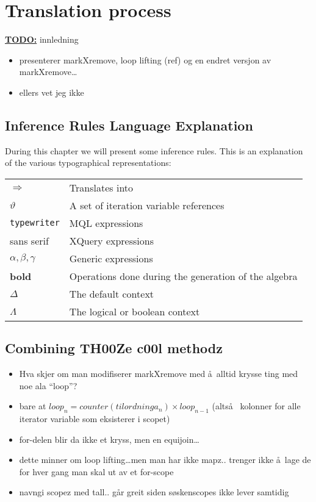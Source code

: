 \chapter{Translation process}


\textbf{\underline{\LARGE TODO:}} innledning
\begin{itemize}
  \item presenterer markXremove, loop lifting (ref) og en endret versjon av
  markXremove\ldots
  \item ellers vet jeg ikke
\end{itemize}


\section{Inference Rules Language Explanation}
\label{sect:translation:inferenceExplanation}
During this chapter we will present some inference rules. This is an explanation
of the various typographical representations:

\begin{tabular}{l|l}

  $\Longrightarrow$  & Translates into \\
  $\vartheta$ & A set of iteration variable references \\
  \texttt{typewriter} & MQL expressions \\
  \textsf{sans serif} & XQuery expressions \\
  $\alpha , \beta, \gamma$ & Generic expressions \\
  \textbf{bold} & Operations done during the generation of the algebra \\
  $\Delta$ & The default context \\
  $\Lambda$ & The logical or boolean context \\
  
\end{tabular}








\section{Combining TH00Ze c00l methodz}
\begin{itemize}
  \item Hva skjer om man modifiserer markXremove med \aa~alltid krysse ting med
  noe ala ``loop''?
  \item bare at $loop_{n} = counter(tilordninga_{n}) \times loop_{n-1}$
  (alts\aa~ kolonner for alle iterator variable som eksisterer i scopet)
  \item for-delen blir da ikke et kryss, men en equijoin\ldots
  \item dette minner om loop lifting\ldots men man har ikke mapz.. trenger ikke
  \aa~lage de for hver gang man skal ut av et for-scope
  \item navngi scopez med tall.. g\aa r greit siden s\o skenscopes ikke lever
  samtidig
\end{itemize}
